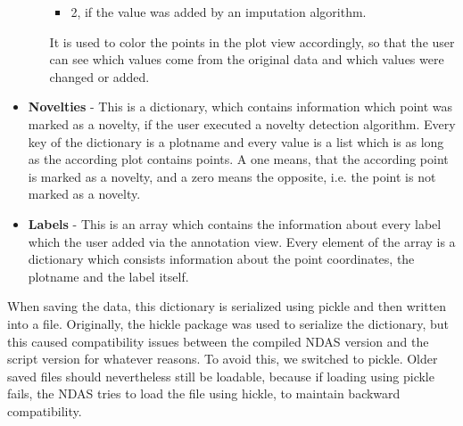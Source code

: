 \begin{itemize}
\begin{itemize}
\begin{itemize}
\item 2, if the value was added by an imputation algorithm.
\end{itemize}
It is used to color the points in the plot view accordingly, so that the user can see which values come from the original data and which values were changed or added. 
\end{itemize}
\item \textbf{Novelties} - This is a dictionary, which contains information which point was marked as a novelty, if the user executed a novelty detection algorithm. Every key of the dictionary is a plotname and every value is a list which is as long as the according plot contains points. A one means, that the according point is marked as a novelty, and a zero means the opposite, i.e. the point is not marked as a novelty.
\item \textbf{Labels} - This is an array which contains the information about every label which the user added via the annotation view. Every element of the array is a dictionary which consists information about the point coordinates, the plotname and the label itself.  
\end{itemize}

When saving the data, this dictionary is serialized using pickle and then written into a file. Originally, the hickle package was used to serialize the dictionary, but this caused compatibility issues between the compiled NDAS version and the script version for whatever reasons. To avoid this, we switched to pickle. Older saved files should nevertheless still be loadable, because if loading using pickle fails, the NDAS tries to load the file using hickle, to maintain backward compatibility. 